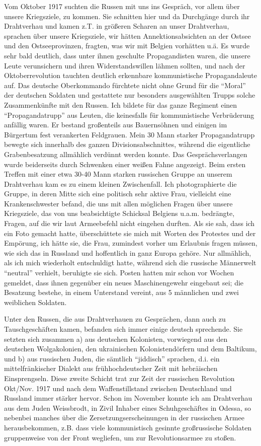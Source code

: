 Vom Oktober 1917 suchten die Russen mit uns ins Gespräch, vor allem über unsere Kriegsziele, zu kommen. Sie schnitten hier und da Durchgänge durch ihr Drahtverhau und kamen z.T. in größeren Scharen an unser Drahtverhau, sprachen über unsere Kriegsziele, wir hätten Annektionsabsichten an der Ostsee und den Ostseeprovinzen, fragten, was wir mit Belgien vorhätten u.ä. Es wurde sehr bald deutlich, dass unter ihnen geschulte Propagandisten waren, die unsere Leute verunsichern und ihren Widerstandswillen lähmen sollten, und nach der Oktoberrevolution tauchten deutlich erkennbare kommunistische Propagandaleute auf. Das deutsche Oberkommando fürchtete nicht ohne Grund für die \enquote{Moral} der deutschen Soldaten und gestattete nur besonders ausgewählten Trupps solche Zusammenkünfte mit den Russen. Ich bildete für das ganze Regiment einen \enquote{Propagandatrupp} aus Leuten, die keinesfalls für kommunistische Verbrüderung anfällig waren. Er bestand großenteils aus Bauernsöhnen und einigen im Bürgertum fest verankerten Feldgrauen. Mein 30 Mann starker Propagandatrupp bewegte sich innerhalb des ganzen Divisionsabschnittes, während die eigentliche Grabenbesatzung allmählich verdünnt werden konnte. Das Gesprächsverlangen wurde beiderseits durch Schwenken einer weißen Fahne angezeigt. Beim ersten Treffen mit einer etwa 30-40 Mann starken russischen Gruppe an unserem Drahtverhau kam es zu einem kleinen Zwischenfall. Ich photographierte die Gruppe, in deren Mitte sich eine politisch sehr aktive Frau, vielleicht eine Krankenschwester befand, die uns mit allen möglichen Fragen über unsere Kriegsziele, das von uns beabsichtigte Schicksal Belgiens u.a.m. bedrängte, Fragen, auf die wir laut Armeebefehl nicht eingehen durften. Als sie sah, dass ich ein Foto gemacht hatte, überschüttete sie mich mit Worten des Protestes und der Empörung, ich hätte sie, die Frau, zumindest vorher um Erlaubnis fragen müssen, wie sich das in Russland und hoffentlich in ganz Europa gehöre. Nur allmählich, als ich mich wiederholt entschuldigt hatte, während sich die russische  Männerwelt \enquote{neutral} verhielt, beruhigte sie sich. Posten hatten mir schon vor Wochen gemeldet, dass ihnen gegenüber ein neues Maschinengewehr eingebaut sei; die Besatzung bestehe, in einem Unterstand vereint, aus 5 männlichen und zwei weiblichen Soldaten.

Unter den Russen, die aus Drahtverhauen zu Gesprächen, dann auch zu Tauschgeschäften kamen, befanden sich immer einige deutsch sprechende. Sie setzten sich zusammen a) aus deutschen Kolonisten, vorwiegend aus den deutschen Wolgakolonien, den ukrainischen Kolonistendörfern und dem Baltikum, und b) aus russischen Juden, die sämtlich \enquote{jiddisch} sprachen, d.i. ein mittelfränkischer Dialekt aus frühhochdeutscher Zeit mit hebräischen Einsprengseln. Diese zweite Schicht trat zur Zeit der russischen Revolution Okt/Nov. 1917 und nach dem Waffenstillstand zwischen Deutschland und Russland immer stärker hervor. Schon im November konnte ich am Drahtverhau aus dem Juden Weissbrodt, in Zivil Inhaber eines Schuhgeschäftes in Odessa, so nebenbei manches über die Zersetzungserscheinungen in der russischen Armee herausbekommen, z.B. dass viele kommunistisch gesinnte großrussische Soldaten gruppenweise von der Front wegliefen, um zur Revolutionsarmee zu stoßen.

